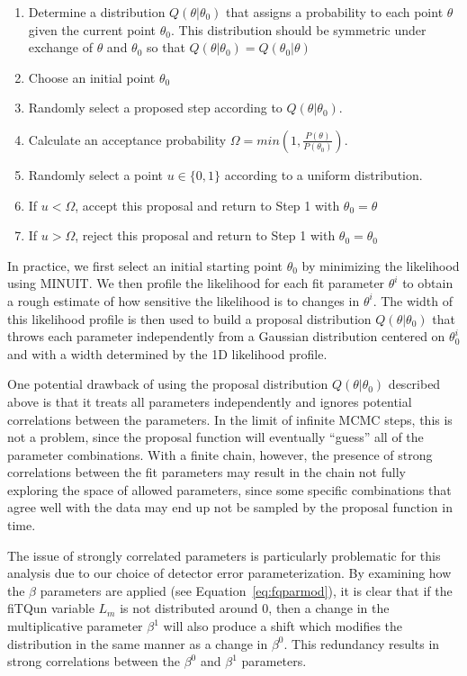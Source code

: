 \begin{enumerate}
  \item Determine a distribution $Q(\theta|\theta_{0})$ that assigns a
    probability to each point $\theta$ given the current point $\theta_{0}$.
    This distribution should be symmetric under exchange of $\theta$ and
    $\theta_{0}$ so that $Q(\theta|\theta_{0}) = Q(\theta_{0}|\theta) $
  \item Choose an initial point  $\theta_{0}$
  \item Randomly select a proposed step according to $Q(\theta|\theta_{0})$.
  \item Calculate an acceptance probability $\Omega = min(1,\frac{P(\theta)}{P(\theta_{0})})$.
  \item Randomly select a point $u \in \{0, 1\}$ according to a uniform distribution.
  \item If $u<\Omega$, accept this proposal and return to Step 1 with $\theta_{0} = \theta$ 
  \item If $u>\Omega$, reject this proposal and return to Step 1 with $\theta_{0} = \theta_{0}$ 
\end{enumerate}

In practice, we first select an initial starting point $\theta_{0}$ by
minimizing the likelihood using MINUIT\@.  We then profile the likelihood for
each fit parameter $\theta^{i}$ to obtain a rough estimate of how sensitive the
likelihood is to changes in $\theta^{i}$.  The width of this likelihood profile
is then used to build a proposal distribution $Q(\theta|\theta_{0})$ that
throws each parameter independently from a Gaussian distribution centered on
$\theta^{i}_{0}$ and with a width determined by the 1D likelihood profile.

One potential drawback of using the proposal distribution
$Q(\theta|\theta_{0})$ described above is that it treats all parameters
independently and ignores potential correlations between the parameters.  In
the limit of infinite MCMC steps, this is not a problem, since the proposal
function will eventually ``guess'' all of the parameter combinations.  With a
finite chain, however, the presence of strong correlations between the fit
parameters may result in the chain not fully exploring the space of allowed
parameters, since some specific combinations that agree well with the data may
end up not be sampled by the proposal function in time.

The issue of strongly correlated parameters is particularly problematic for
this analysis due to our choice of detector error parameterization.  By
examining how the $\beta$ parameters are applied (see
Equation~\ref{eq:fqparmod}), it is clear that if the fiTQun variable $L_{m}$ is
not distributed around $0$, then a change in the multiplicative parameter
$\beta^{1}$ will also produce a shift which modifies the distribution in the
same manner as a change in $\beta^{0}$.  This redundancy results in strong
correlations between the $\beta^{0}$ and $\beta^{1}$ parameters.

